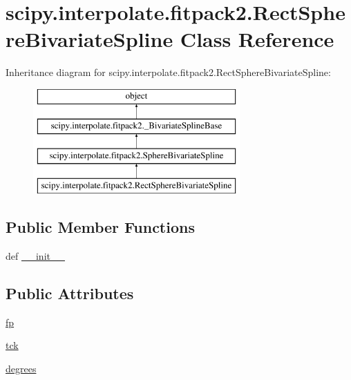 \hypertarget{classscipy_1_1interpolate_1_1fitpack2_1_1RectSphereBivariateSpline}{}\section{scipy.\+interpolate.\+fitpack2.\+Rect\+Sphere\+Bivariate\+Spline Class Reference}
\label{classscipy_1_1interpolate_1_1fitpack2_1_1RectSphereBivariateSpline}
Inheritance diagram for scipy.\+interpolate.\+fitpack2.\+Rect\+Sphere\+Bivariate\+Spline\+:\begin{figure}[H]
\begin{center}
\leavevmode
\includegraphics[height=4.000000cm]{classscipy_1_1interpolate_1_1fitpack2_1_1RectSphereBivariateSpline}
\end{center}
\end{figure}
\subsection*{Public Member Functions}
\begin{DoxyCompactItemize}
\item 
def \hyperlink{classscipy_1_1interpolate_1_1fitpack2_1_1RectSphereBivariateSpline_a63fc2de3f777c05895379e9fe2deca03}{\+\_\+\+\_\+init\+\_\+\+\_\+}
\end{DoxyCompactItemize}
\subsection*{Public Attributes}
\begin{DoxyCompactItemize}
\item 
\hyperlink{classscipy_1_1interpolate_1_1fitpack2_1_1RectSphereBivariateSpline_a1564fe91b8a9119cb1259c725f2c1435}{fp}
\item 
\hyperlink{classscipy_1_1interpolate_1_1fitpack2_1_1RectSphereBivariateSpline_a47f1669e4cfcff3e40efb6cd08a3c49c}{tck}
\item 
\hyperlink{classscipy_1_1interpolate_1_1fitpack2_1_1RectSphereBivariateSpline_a2ea7d2cb1340ce8bfa0cc9f518885551}{degrees}
\end{DoxyCompactItemize}


